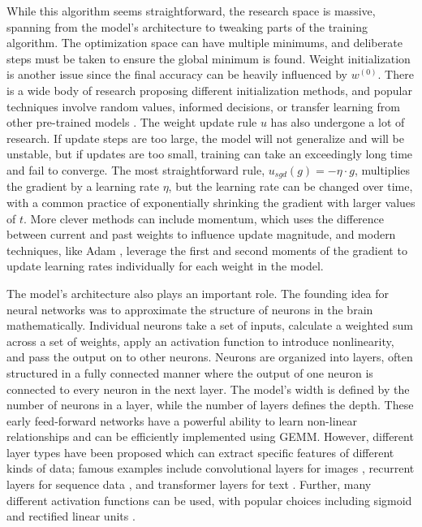 While this algorithm seems straightforward, the research space is massive, spanning from the model's architecture to tweaking parts of the training algorithm.
The optimization space can have multiple minimums, and deliberate steps must be taken to ensure the global minimum is found. 
Weight initialization is another issue since the final accuracy can be heavily influenced by $w^{(0)}$.
There is a wide body of research proposing different initialization methods, and popular techniques involve random values, informed decisions, or transfer learning from other pre-trained models \cite{Glorot2010XavierInitalization}.
The weight update rule $u$ has also undergone a lot of research.
If update steps are too large, the model will not generalize and will be unstable, but if updates are too small, training can take an exceedingly long time and fail to converge.
The most straightforward rule, $u_{sgd}(g)=-\eta \cdot g$, multiplies the gradient by a learning rate $\eta$, but the learning rate can be changed over time, with a common practice of exponentially shrinking the gradient with larger values of $t$.
More clever methods can include momentum, which uses the difference between current and past weights to influence update magnitude, and modern techniques, like Adam \cite{Kingma2015Adam}, leverage the first and second moments of the gradient to update learning rates individually for each weight in the model.

The model's architecture also plays an important role.
The founding idea for neural networks was to approximate the structure of neurons in the brain mathematically.
Individual neurons take a set of inputs, calculate a weighted sum across a set of weights, apply an activation function to introduce nonlinearity, and pass the output on to other neurons. 
Neurons are organized into layers, often structured in a fully connected manner where the output of one neuron is connected to every neuron in the next layer.
The model's width is defined by the number of neurons in a layer, while the number of layers defines the depth.
These early feed-forward networks have a powerful ability to learn non-linear relationships and can be efficiently implemented using \gls{GEMM}.
However, different layer types have been proposed which can extract specific features of different kinds of data; famous examples include convolutional layers for images \cite{Krizhevsky2012AlexNet}, recurrent layers for sequence data \cite{cho2014PhraseRepresentationRNN}, and transformer layers for text \cite{Vaswani2017AttentionTransformer}.
Further, many different activation functions can be used, with popular choices including sigmoid and rectified linear units \cite{Nair2010ReLU}.

